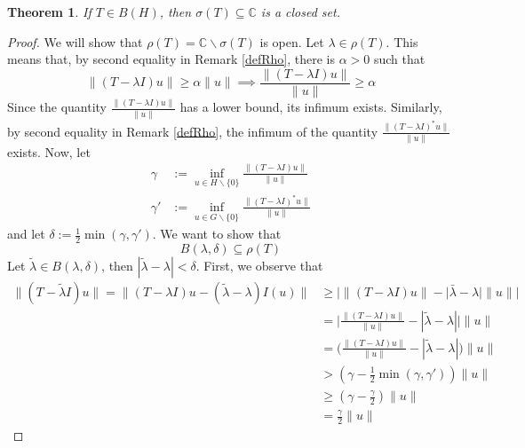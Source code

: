 \documentclass{report}
\newtheorem{thm}{Theorem}
\begin{document}
\begin{thm} \label{SpectIsCl}
  If $T\in B(H)$, then $\sigma(T)\subseteq\mathbb{C}$ is a closed set.
\end{thm}
\begin{proof}
  We will show that $\rho(T)=\mathbb{C}\backslash\sigma(T)$ is open. Let $\lambda\in\rho(T)$. This means that, by second equality in Remark \ref{defRho}, there is $\alpha>0$ such that
  $$
  \lVert(T-\lambda I)u\rVert\geq\alpha\lVert u\rVert\implies\frac{\lVert(T-\lambda I)u\rVert}{\lVert u\rVert}\geq\alpha
  $$
  Since the quantity $\frac{\lVert(T-\lambda I)u\rVert}{\lVert u\rVert}$ has a lower bound, its infimum exists. Similarly, by second equality in Remark \ref{defRho}, the infimum of the quantity $\frac{\lVert(T-\lambda I)^{*}u\rVert}{\lVert u\rVert}$ exists. Now, let
  $$
  \begin{aligned}
    \gamma&:=\inf_{u\in H\backslash\{0\}}\frac{\lVert(T-\lambda I)u\rVert}{\lVert u\rVert} \\
    \gamma'&:=\inf_{u\in G\backslash\{0\}}\frac{\lVert(T-\lambda I)^{*}u\rVert}{\lVert u\rVert}
  \end{aligned}
  $$
  and let $\delta:=\frac{1}{2}\min(\gamma,\gamma')$. We want to show that
  $$
  B(\lambda,\delta)\subseteq\rho(T)
  $$
  Let $\tilde{\lambda}\in B(\lambda,\delta)$, then $|\tilde{\lambda}-\lambda|<\delta$. First, we observe that
  $$
  \begin{aligned}
    \lVert(T-\tilde{\lambda}I)u\rVert=\lVert(T-\lambda I)u-(\tilde{\lambda}-\lambda)I(u)\rVert&\geq|\lVert(T-\lambda I)u\rVert-|\bar{\lambda}-\lambda|\lVert u\rVert| \\
                                                                                              &=\Big|\frac{\lVert(T-\lambda I)u\rVert}{\lVert u\rVert}-|\tilde{\lambda}-\lambda|\Big|\lVert u\rVert \\
                                                                                              &=\Big(\frac{\lVert(T-\lambda I)u\rVert}{\lVert u\rVert}-|\tilde{\lambda}-\lambda|\Big)\lVert u\rVert \\
                                                                                              &>(\gamma-\frac{1}{2}\min(\gamma,\gamma'))\lVert u\rVert \\
                                                                                              &\geq(\gamma-\frac{\gamma}{2})\lVert u\rVert \\
                                                                                              &=\frac{\gamma}{2}\lVert u\rVert

\end{aligned}$$
\end{proof}
\end{document}
